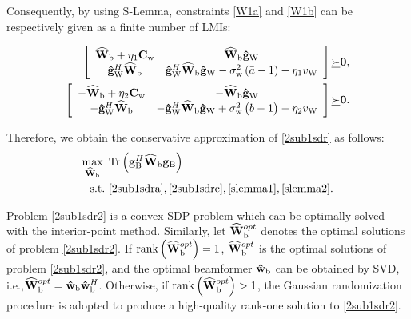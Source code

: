 \documentclass[10pt,journal,letterpaper,twocolumn,twoside]{IEEEtran} %
\begin{document}
Consequently, by using S-Lemma,  constraints \eqref{W1a} and \eqref{W1b} can be respectively given  as a finite number of LMIs:
\begin{small}
\begin{subequations}
\begin{align}
\left[ {\begin{array}{*{20}{c}}
{{{\widehat {\bf{W}}}_{\rm{b}}} + {\eta _1}{{\bf{C}}_{\rm{w}}}}&{{{\widehat {\bf{W}}}_{\rm{b}}}{{{\bf{\hat g}}}_{\rm{W}}}}\\
{{\bf{\hat g}}_{\rm{W}}^H{{\widehat {\bf{W}}}_{\rm{b}}}}&{{\bf{\hat g}}_{\rm{W}}^H{{\widehat {\bf{W}}}_{\rm{b}}}{{{\bf{\hat g}}}_{\rm{W}}} - \sigma _{\rm{w}}^2\left( {\bar a - 1} \right) - {\eta _1}{v_{\rm{W}}}}
\end{array}} \right]\underline  \succ  {\bf{0}}\label{slemma1},\\
\left[ {\begin{array}{*{20}{c}}
{ - {{\widehat {\bf{W}}}_{\rm{b}}} + {\eta _2}{{\bf{C}}_{\rm{w}}}}&{ - {{\widehat {\bf{W}}}_{\rm{b}}}{{{\bf{\hat g}}}_{\rm{W}}}}\\
{ - {\bf{\hat g}}_{\rm{W}}^H{{\widehat {\bf{W}}}_{\rm{b}}}}&{ - {\bf{\hat g}}_{\rm{W}}^H{{\widehat {\bf{W}}}_{\rm{b}}}{{{\bf{\hat g}}}_{\rm{W}}} + \sigma _{\rm{w}}^2\left( {\bar b - 1} \right) - {\eta _2}{v_{\rm{W}}}}
\end{array}} \right]\underline  \succ  {\bf{0}}\label{slemma2}.
\end{align}
\end{subequations}
\end{small}

Therefore, we obtain the conservative approximation of \eqref{2sub1sdr} as follows:
\begin{align}\label{2sub1sdr2}
\mathop {\max }\limits_{{\widehat {\bf{W}}_{\rm{b}}}} {\rm{ }}~&{\rm{Tr}}\left( {{{\bf{g}}_{\rm{B}}^H}{{\widehat {\bf{W}}}_{\rm{b}}}{\bf{g}}_{\rm{B}}} \right)\\
{\rm{s}}.{\rm{t}}.~&\eqref{2sub1sdra}, \eqref{2sub1sdrc}, \eqref{slemma1}, \eqref{slemma2}\notag.
 \end{align}

Problem \eqref{2sub1sdr2} is a convex SDP problem which can be optimally solved with the interior-point method.
Similarly,   let ${\widehat {\bf{W}}_{\rm{b}}}^{opt}$  denotes the optimal solutions of problem \eqref{2sub1sdr2}.
If ${\rm{rank}}\left( {{\widehat {\bf{W}}_{\rm{b}}}^{opt}} \right) = 1$, ${\widehat {\bf{W}}_{\rm{b}}}^{opt}$ is the optimal solutions of problem \eqref{2sub1sdr2}, and the optimal beamformer  ${{{\bf{\hat w}}}_{\rm{b}}}$  can be obtained by SVD, i.e.,${\widehat {\bf{W}}_{\rm{b}}}^{opt} = {{{\bf{\hat w}}}_{\rm{b}}}{{{\bf{\hat w}}}_{\rm{b}}}^H$.
Otherwise, if ${\rm{rank}}\left( {{\widehat {\bf{W}}_{\rm{b}}}^{opt}} \right) > 1$,
   the   Gaussian randomization procedure \cite{ZLuo10Semidefinite}   is adopted to produce a high-quality rank-one solution to \eqref{2sub1sdr2}.
\end{document}
